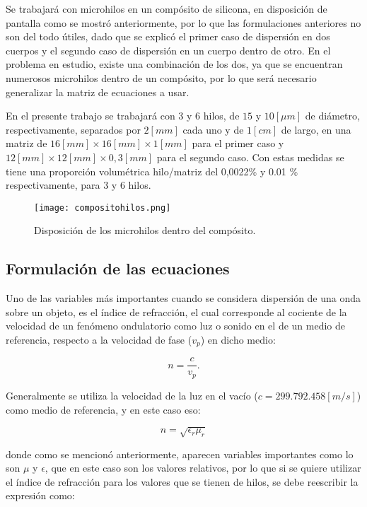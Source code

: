 \documentclass[12pt,letterpaper]{article}
\numberwithin{equation}{section}
\begin{document}
Se trabajará con microhilos en un compósito de silicona, en disposición de pantalla como se mostró anteriormente, por lo que las formulaciones anteriores no son del todo útiles, dado que se explicó el primer caso de dispersión en dos cuerpos y el segundo caso de dispersión en un cuerpo dentro de otro. En el problema en estudio, existe una combinación de los dos, ya que se encuentran numerosos microhilos dentro de un compósito, por lo que será necesario generalizar la matriz de ecuaciones a usar.

En el presente trabajo se trabajará con 3 y 6 hilos, de $15$ y $10 [\mu m]$ de diámetro, respectivamente, separados por $2 [mm]$ cada uno y de $1 [cm]$ de largo, en una matriz de $16 [mm] \times 16 [mm] \times 1 [mm]$ para el primer caso y $12 [mm] \times 12 [mm] \times 0,3 [mm]$ para el segundo caso. Con estas medidas se tiene una proporción volumétrica hilo/matriz del 0,0022\% y  0.01 \% respectivamente, para 3 y 6 hilos. 

\begin{figure}[H]
	\centering\texttt{[image: compositohilos.png]}
	\caption{Disposición de los microhilos dentro del compósito.}
\end{figure}

\subsection{Formulación de las ecuaciones}

Uno de las variables más importantes cuando se considera dispersión de una onda sobre un objeto, es el índice de refracción, el cual corresponde al cociente de la velocidad de un fenómeno ondulatorio como luz o sonido en el de un medio de referencia, respecto a la velocidad de fase ($v_{p}$) en dicho medio: 

\begin{equation}
n = \frac{c}{v_{p}}.
\end{equation}

Generalmente se utiliza la  velocidad de la luz en el vacío ($c=299.792.458 [m/s]$) como medio de referencia, y en este caso eso:

\begin{equation}
n = \sqrt{\epsilon_{r}\mu_{r}}
\end{equation}

\noindent donde como se mencionó anteriormente, aparecen variables importantes como lo son $\mu$ y $\epsilon$, que en este caso son los valores relativos, por lo que si se quiere utilizar el índice de refracción para los valores que se tienen de hilos, se debe reescribir la expresión como:
\end{document}
